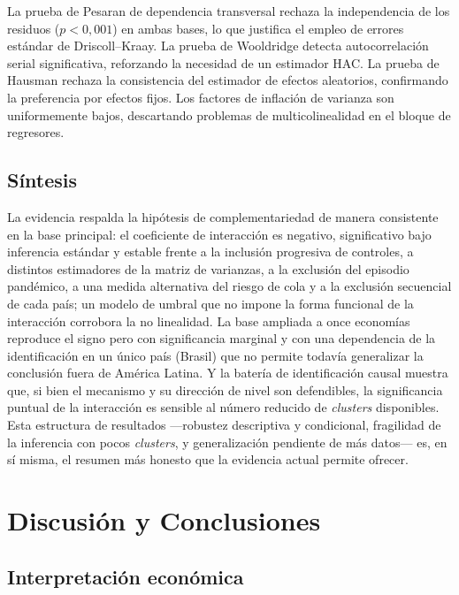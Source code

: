\documentclass[5p,times,twocolumn,authoryear]{elsarticle}
\begin{document}
La prueba de Pesaran de dependencia transversal rechaza la independencia de los residuos ($p<0{,}001$) en ambas bases, lo que justifica el empleo de errores estándar de Driscoll–Kraay. La prueba de Wooldridge detecta autocorrelación serial significativa, reforzando la necesidad de un estimador HAC. La prueba de Hausman rechaza la consistencia del estimador de efectos aleatorios, confirmando la preferencia por efectos fijos. Los factores de inflación de varianza son uniformemente bajos, descartando problemas de multicolinealidad en el bloque de regresores.

\subsection{Síntesis}

La evidencia respalda la hipótesis de complementariedad de manera consistente en la base principal: el coeficiente de interacción es negativo, significativo bajo inferencia estándar y estable frente a la inclusión progresiva de controles, a distintos estimadores de la matriz de varianzas, a la exclusión del episodio pandémico, a una medida alternativa del riesgo de cola y a la exclusión secuencial de cada país; un modelo de umbral que no impone la forma funcional de la interacción corrobora la no linealidad. La base ampliada a once economías reproduce el signo pero con significancia marginal y con una dependencia de la identificación en un único país (Brasil) que no permite todavía generalizar la conclusión fuera de América Latina. Y la batería de identificación causal muestra que, si bien el mecanismo y su dirección de nivel son defendibles, la significancia puntual de la interacción es sensible al número reducido de \textit{clusters} disponibles. Esta estructura de resultados —robustez descriptiva y condicional, fragilidad de la inferencia con pocos \textit{clusters}, y generalización pendiente de más datos— es, en sí misma, el resumen más honesto que la evidencia actual permite ofrecer.


\section{Discusión y Conclusiones}

\subsection{Interpretación económica}
\end{document}
